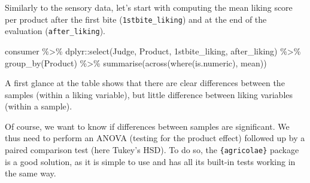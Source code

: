 \documentclass[
]{book}
\newenvironment{Shaded}{\begin{snugshade}}{\end{snugshade}}
\newcommand{\AttributeTok}[1]{\textcolor[rgb]{0.77,0.63,0.00}{#1}}
\newcommand{\FunctionTok}[1]{\textcolor[rgb]{0.00,0.00,0.00}{#1}}
\newcommand{\NormalTok}[1]{#1}
\newcommand{\OtherTok}[1]{\textcolor[rgb]{0.56,0.35,0.01}{#1}}
\newcommand{\SpecialCharTok}[1]{\textcolor[rgb]{0.00,0.00,0.00}{#1}}
\newcommand{\StringTok}[1]{\textcolor[rgb]{0.31,0.60,0.02}{#1}}
\begin{document}
Similarly to the sensory data, let's start with computing the mean liking score per product after the first bite (\texttt{1stbite\_liking}) and at the end of the evaluation (\texttt{after\_liking}).

\begin{Shaded}
\begin{Highlighting}[]
\NormalTok{consumer }\SpecialCharTok{\%\textgreater{}\%} 
\NormalTok{  dplyr}\SpecialCharTok{::}\FunctionTok{select}\NormalTok{(Judge, Product, }\StringTok{\textasciigrave{}}\AttributeTok{1stbite\_liking}\StringTok{\textasciigrave{}}\NormalTok{, }\StringTok{\textasciigrave{}}\AttributeTok{after\_liking}\StringTok{\textasciigrave{}}\NormalTok{) }\SpecialCharTok{\%\textgreater{}\%} 
  \FunctionTok{group\_by}\NormalTok{(Product) }\SpecialCharTok{\%\textgreater{}\%} 
  \FunctionTok{summarise}\NormalTok{(}\FunctionTok{across}\NormalTok{(}\FunctionTok{where}\NormalTok{(is.numeric), mean))}
\end{Highlighting}
\end{Shaded}

A first glance at the table shows that there are clear differences between the samples (within a liking variable), but little difference between liking variables (within a sample).

Of course, we want to know if differences between samples are significant. We thus need to perform an ANOVA (testing for the product effect) followed up by a paired comparison test (here Tukey's HSD). To do so, the \texttt{\{agricolae\}} package is a good solution, as it is simple to use and has all its built-in tests working in the same way.

\begin{Shaded}
\end{Shaded}
\end{document}
